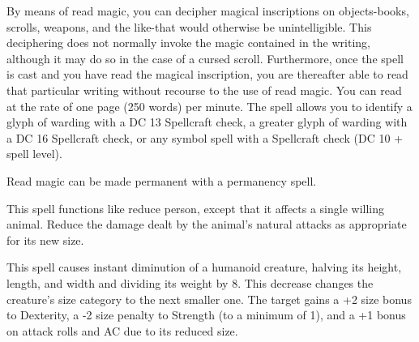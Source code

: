 \begin{multicols}{2}
\begin{small}
\noindent By means of read magic, you can decipher magical inscriptions on objects-books, scrolls, weapons, and the like-that would otherwise be unintelligible. This deciphering does not normally invoke the magic contained in the writing, although it may do so in the case of a cursed scroll. Furthermore, once the spell is cast and you have read the magical inscription, you are thereafter able to read that particular writing without recourse to the use of read magic. You can read at the rate of one page (250 words) per minute. The spell allows you to identify a glyph of warding with a DC 13 Spellcraft check, a greater glyph of warding with a DC 16 Spellcraft check, or any symbol spell with a Spellcraft check (DC 10 + spell level).

\smallskip\noindent Read magic can be made permanent with a permanency spell.


\noindent This spell functions like reduce person, except that it affects a single willing animal. Reduce the damage dealt by the animal's natural attacks as appropriate for its new size.

\noindent This spell causes instant diminution of a humanoid creature, halving its height, length, and width and dividing its weight by 8. This decrease changes the creature's size category to the next smaller one. The target gains a +2 size bonus to Dexterity, a -2 size penalty to Strength (to a minimum of 1), and a +1 bonus on attack rolls and AC due to its reduced size.


\end{small}
\end{multicols}
